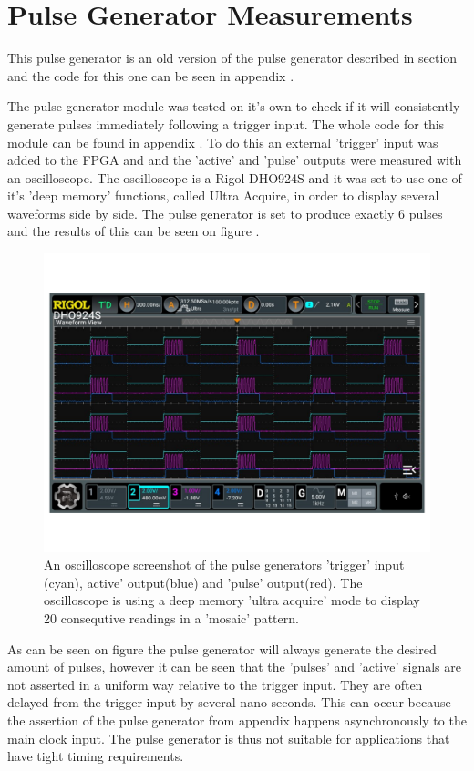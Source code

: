 \chapter{Pulse Generator Measurements} \label{App:PulseGenTest}
This pulse generator is an old version of the pulse generator described in section  and the code for this one can be seen in appendix .

The pulse generator module was tested on it's own to check if it will consistently generate pulses immediately following a trigger input. The whole code for this module can be found in appendix . To do this an external 'trigger' input was added to the FPGA and and the 'active' and 'pulse' outputs were measured with an oscilloscope. The oscilloscope is a Rigol DHO924S and it was set to use one of it's 'deep memory' functions, called Ultra Acquire, in order to display several waveforms side by side. The pulse generator is set to produce exactly 6 pulses and the results of this can be seen on figure .

\begin{figure}[H]
    \centering
    \includegraphics[clip, trim=0 50 0 50, width=1\textwidth]{Appendix/Figures/A_PulseGen_Test.pdf}
    \caption{An oscilloscope screenshot of the pulse generators 'trigger' input (cyan), active' output(blue) and 'pulse' output(red). The oscilloscope is using a deep memory 'ultra acquire' mode to display 20 consequtive readings in a 'mosaic' pattern.}
    \label{fig:A_PulseGen_Test}
\end{figure}

As can be seen on figure  the pulse generator will always generate the desired amount of pulses, however it can be seen that the 'pulses' and 'active' signals are not asserted in a uniform way relative to the trigger input. They are often delayed from the trigger input by several nano seconds. This can occur because the assertion of the pulse generator from appendix  happens asynchronously to the main clock input. The pulse generator is thus not suitable for applications that have tight timing requirements. 